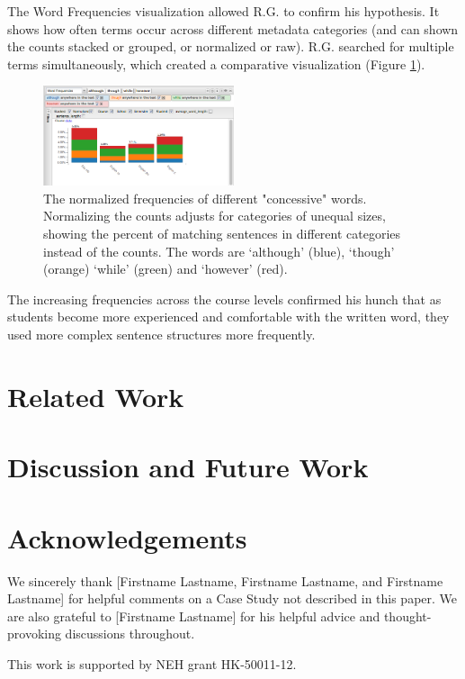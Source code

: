 \documentclass{sig-alternate}
\begin{document}
The Word Frequencies visualization allowed R.G. to confirm his hypothesis. It shows how often terms occur across different metadata categories (and can shown the counts stacked or grouped, or normalized or raw). R.G. searched for multiple terms simultaneously, which created a comparative visualization (Figure \ref{fig:rex05}).

\begin{figure}[h!]
\includegraphics[width=0.5\textwidth]{fig/rex/05.png}
\caption{The normalized frequencies of different "concessive" words. Normalizing the counts adjusts for categories of unequal sizes, showing the percent of matching sentences in different categories instead of the counts. The words are `although' (blue), `though' (orange) `while' (green) and `however' (red). \label{fig:rex05}}
\end{figure}

The increasing frequencies across the course levels confirmed his hunch that as students become more experienced and comfortable with the written word, they used more complex sentence structures more frequently. 

\section {Related Work}

\section{Discussion and Future Work}

\section{Acknowledgements}
We sincerely thank [Firstname Lastname, Firstname Lastname, and Firstname Lastname] for helpful comments on a Case Study not described in this paper. We are also grateful to [Firstname Lastname] for his helpful advice and thought-provoking discussions throughout.

This work is supported by NEH grant HK-50011-12.


 
  
\end{document}
